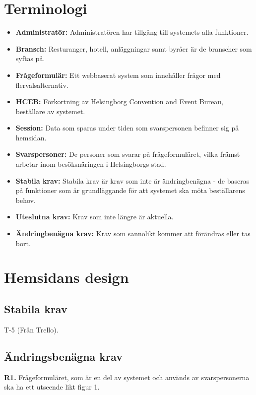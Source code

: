 \documentclass{article}
\begin{document}
    \section{Terminologi}
    \begin{itemize}
        \item \textbf{Administratör:} Administratören har tillgång till systemets alla funktioner.
        \item \textbf{Bransch:} Resturanger, hotell, anläggningar samt byråer är de branscher som syftas på.
         \item \textbf{Frågeformulär:} Ett webbaserat system som innehåller frågor med flervalsalternativ.
        \item \textbf{HCEB:} Förkortning av Helsingborg Convention and Event Bureau, beställare av systemet.
        \item \textbf{Session:} Data som sparas under tiden som svarspersonen befinner sig på hemsidan.
        \item \textbf{Svarspersoner:}  De personer som svarar på frågeformuläret, vilka främst arbetar inom besöksnäringen i Helsingborgs stad. 
        \item\textbf{Stabila krav:}  Stabila krav är krav som inte är ändringbenägna - de baseras på funktioner som är grundläggande för att systemet ska möta beställarens behov.
         \item \textbf{Uteslutna krav:}  Krav som inte längre är aktuella.
        \item \textbf{Ändringbenägna krav:}  Krav som sannolikt kommer att förändras eller tas bort.
       
    \end{itemize}
    \newpage
    \section{Hemsidans design}
    
    \subsection{Stabila krav}
    
    T-5 (Från Trello).
     
    \subsection{Ändringsbenägna krav}
    
    \large{\textbf{R1.}}
    \normalsize{Frågeformuläret, som är en del av systemet och används av svarspersonerna ska ha ett utseende likt figur 1.}
    
\end{document}
